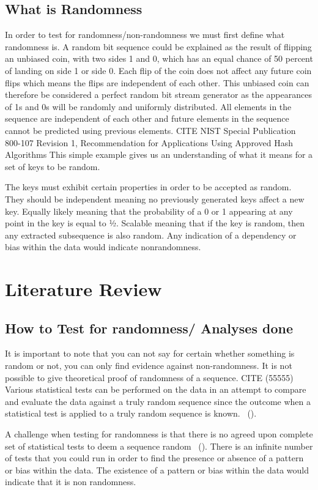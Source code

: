 \subsection{What is Randomness}
In order to test for randomness/non-randomness we must first define what randomness is. A random bit sequence could be explained as the result of flipping an unbiased coin, with two sides 1 and 0, which has an equal chance of 50 percent of landing on side 1 or side 0. Each flip of the coin does not affect any future coin flips which means the flips are independent of each other. This unbiased coin can therefore be considered a perfect random bit stream generator as the appearances of 1s and 0s will be randomly and uniformly distributed. All elements in the sequence are independent of each other and future elements in the sequence cannot be predicted using previous elements. CITE NIST Special Publication 800-107 Revision 1, Recommendation for Applications Using Approved Hash Algorithms This simple example gives us an understanding of what it means for a set of keys to be random. \par
The keys must exhibit certain properties in order to be accepted as random. They should be independent meaning no previously generated keys affect a new key.  Equally likely meaning that  the probability of a 0 or 1 appearing at any point in the key is equal to ½. Scalable meaning that if the key is random, then any extracted subsequence is also random. Any indication of a dependency or bias within the data would indicate nonrandomness. 
\section{Literature Review}
\subsection{How to Test for randomness/ Analyses done}
It is important to note that you can not say for certain whether something is random or not, you can only find evidence against non-randomness. It is not possible to give theoretical proof of randomness of a sequence. CITE (55555) Various statistical tests can be performed on the data in an attempt to compare and evaluate the data against a truly random sequence since the outcome when a statistical test is applied to a truly random sequence is known. ~(\cite{98765}).\par
A challenge when testing for randomness is that there is no agreed upon complete set of statistical tests to deem a sequence random ~(\cite{98765}). There is an infinite number of tests that you could run in order to find the presence or absence of a pattern or bias within the data. The existence of a pattern or bias within the data would indicate that it is non randomness. \par

